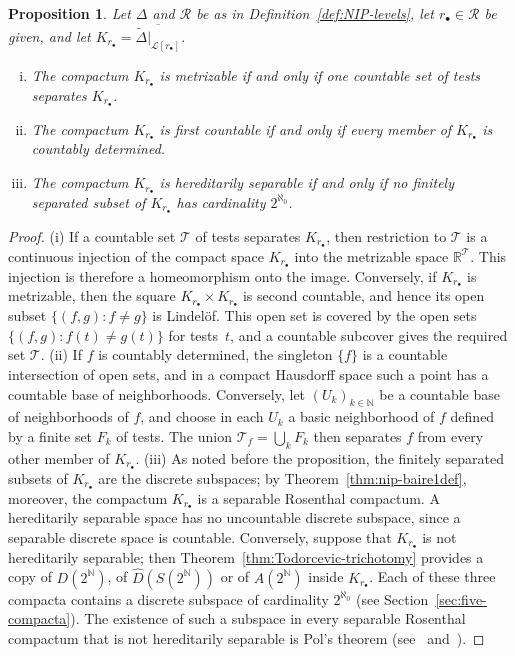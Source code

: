 \documentclass[psamsfonts]{amsart}
\newtheorem{prop}[thm]{Proposition}
\theoremstyle{definition}
\theoremstyle{remark}
\numberwithin{equation}{section}
\begin{document}
\begin{prop}\label{prop:levels-tests}
  Let $\Delta$ and $\mathscr{R}$ be as in Definition~\ref{def:NIP-levels}, let $r_\bullet\in \mathscr{R}$ be given, and let $K_{r_\bullet}=\overline{\tilde\Delta|_{\mathcal{L}[r_\bullet]}}$.
  \begin{enumerate}[(i)]
  \item
    The compactum $K_{r_\bullet}$ is metrizable if and only if one countable set of tests separates $K_{r_\bullet}$.
  \item
    The compactum $K_{r_\bullet}$ is first countable if and only if every member of $K_{r_\bullet}$ is countably determined.
  \item
    The compactum $K_{r_\bullet}$ is hereditarily separable if and only if no finitely separated subset of $K_{r_\bullet}$ has cardinality $2^{\aleph_0}$.
  \end{enumerate}
\end{prop}

\begin{proof}
  (i) If a countable set $\mathcal{T}$ of tests separates $K_{r_\bullet}$, then restriction to $\mathcal{T}$ is a continuous injection of the compact space $K_{r_\bullet}$ into the metrizable space $\mathbb{R}^{\mathcal{T}}$.
  This injection is therefore a homeomorphism onto the image.
  Conversely, if $K_{r_\bullet}$ is metrizable, then the square $K_{r_\bullet}\times K_{r_\bullet}$ is second countable, and hence its open subset $\{(f,g):f\ne g\}$ is Lindelöf.
  This open set is covered by the open sets $\{(f,g):f(t)\ne g(t)\}$ for tests~$t$, and a countable subcover gives the required set $\mathcal{T}$.
  (ii) If $f$ is countably determined, the singleton $\{f\}$ is a countable intersection of open sets, and in a compact Hausdorff space such a point has a countable base of neighborhoods.
  Conversely, let $(U_k)_{k\in\mathbb{N}}$ be a countable base of neighborhoods of $f$, and choose in each $U_k$ a basic neighborhood of $f$ defined by a finite set $F_k$ of tests.
  The union $\mathcal{T}_f=\bigcup_kF_k$ then separates $f$ from every other member of $K_{r_\bullet}$.
  (iii) As noted before the proposition, the finitely separated subsets of $K_{r_\bullet}$ are the discrete subspaces; by Theorem~\ref{thm:nip-baire1def}, moreover, the compactum $K_{r_\bullet}$ is a separable Rosenthal compactum.
  A hereditarily separable space has no uncountable discrete subspace, since a separable discrete space is countable.
  Conversely, suppose that $K_{r_\bullet}$ is not hereditarily separable;
  then Theorem~\ref{thm:Todorcevic-trichotomy} provides a copy of $D(2^{\mathbb{N}})$, of $\hat{D}(S(2^{\mathbb{N}}))$ or of $A(2^{\mathbb{N}})$ inside $K_{r_\bullet}$.
  Each of these three compacta contains a discrete subspace of cardinality $2^{\aleph_0}$ (see Section~\ref{sec:five-compacta}).
  The existence of such a subspace in every separable Rosenthal compactum that is not hereditarily separable is Pol's theorem (see~\cite{argyros2008rosenthal} and~\cite[Theorem~0.4]{glasner2022tame}).
\end{proof}
\end{document}
